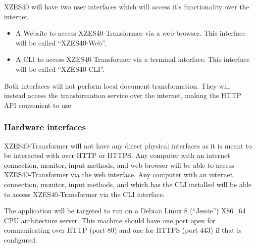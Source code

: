 XZES40 will have two user interfaces which will access it's functionality over the internet.

\begin{itemize}
    \item {
      A Website to access XZES40-Transformer via a web-browser.
      This interface will be called ``XZES40-Web''.
    }
    \item {
      A CLI to access XZES40-Transformer via a terminal interface.
      This interface will be called ``XZES40-CLI''.
    }
\end{itemize}

Both interfaces will not perform local document transformation.
They will instead access the transformation service over the internet, making the HTTP API convenient to use.


\subsubsection{Hardware interfaces}

XZES40-Transformer will not have any direct physical interfaces as it is meant to be interacted with over HTTP or HTTPS.
Any computer with an internet connection, monitor, input methods, and web-browser will be able to access XZES40-Transformer via the web interface.
Any computer with an internet connection, monitor, input methods, and which has the CLI installed will be able to access XZES40-Transformer via the CLI interface.

The application will be targeted to run on a Debian Linux 8 (``Jessie'') X86\_64 CPU architecture server.
This machine should have one port open for communicating over HTTP (port 80) and one for HTTPS (port 443) if that is configured.

